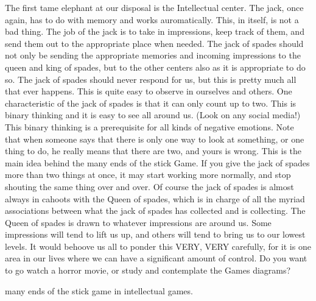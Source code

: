 \documentclass[12pt,letterpaper]{book}
\begin{document}
The first tame elephant at our disposal is the Intellectual center. The jack, once again, has to do with memory and works auromatically. This, in itself, is not a bad thing. The job of the jack is to take in impressions, keep track of them, and send them out to the appropriate place when needed. The jack of spades should not only be sending the appropriate memories and incoming impressions to the queen and king of spades, but to the other centers also as it is appropriate to do so. The jack of spades should never respond for us, but this is pretty much all that ever happens. This is quite easy to observe in ourselves and others. One characteristic of the jack of spades is that it can only count up to two. This is binary thinking and it is easy to see all around us. (Look on any social media!) This binary thinking is a prerequisite for all kinds of negative emotions. Note that when someone says that there is only one way to look at something, or one thing to do, he really means that there are two, and yours is wrong. This is the main idea behind the many ends of the stick Game. If you give the jack of spades more than two things at once, it may start working more normally, and stop shouting the same thing over and over. Of course the jack of spades is almost always in cahoots with the Queen of spades, which is in charge of all the myriad associations between what the jack of spades has collected and is collecting. The Queen of spades is drawn to whatever impressions are around us. Some impressions will tend to lift us up, and others will tend to bring us to our lowest levels. It would behoove us all to ponder this VERY, VERY carefully, for it is one area in our lives where we can have a significant amount of control. Do you want to go watch a horror movie, or study and contemplate the Games diagrams?

many ends of the stick game in intellectual games.
\end{document}

